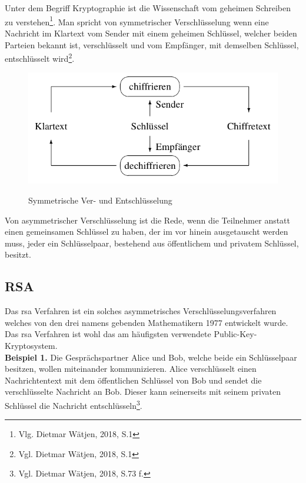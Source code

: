 \section{
}
	\glqq Unter dem Begriff Kryptographie ist die Wissenschaft vom geheimen Schreiben zu verstehen\grqq\footnote{Vlg. Dietmar Wätjen, 2018, S.1}. Man spricht von symmetrischer Verschlüsselung wenn eine Nachricht im Klartext vom Sender mit einem geheimen Schlüssel, welcher beiden Parteien bekannt ist, verschlüsselt und vom Empfänger, mit demselben Schlüssel, entschlüsselt wird\footnote{Vgl. Dietmar Wätjen, 2018, S.1}.
	\begin{figure}[h]
		\begin{minipage}{\textwidth}
			\centering
			\includegraphics[scale=0.5]{figures/ver-und-entschluesseln.png}
			\label{fig:ver-und-entschluesselung}
			\caption{Symmetrische Ver- und Entschlüsselung}
		\end{minipage}
	\end{figure}
	Von asymmetrischer Verschlüsselung ist die Rede, wenn die Teilnehmer anstatt einen gemeinsamen Schlüssel zu haben, der im vor hinein ausgetauscht werden muss, jeder ein Schlüsselpaar, bestehend aus öffentlichem und privatem Schlüssel, besitzt.~\\
	\subsection{RSA}
	Das \gls{rsa} Verfahren ist ein solches asymmetrisches Verschlüsselungsverfahren welches von den drei namens gebenden Mathematikern 1977 entwickelt wurde. Das \gls{rsa} Verfahren ist wohl das am häufigsten verwendete Public-Key-Kryptosystem.~\\
	
	\textbf{Beispiel 1.} Die Gesprächspartner Alice und Bob, welche beide ein Schlüsselpaar besitzen, wollen miteinander kommunizieren. Alice verschlüsselt einen Nachrichtentext mit dem öffentlichen Schlüssel von Bob und sendet die verschlüsselte Nachricht an Bob. Dieser kann seinerseits mit seinem privaten Schlüssel die Nachricht entschlüsseln\footnote{Vgl. Dietmar Wätjen, 2018, S.73 f.}.~\\
	
